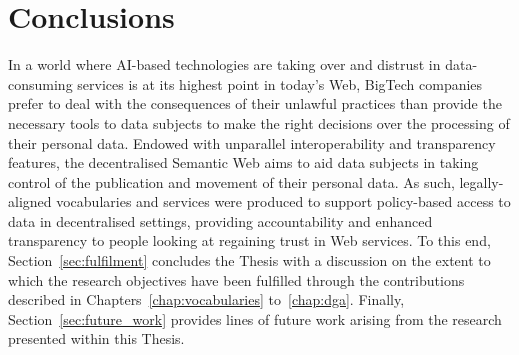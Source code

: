 \chapter{Conclusions}
\label{chap:conclusions}

In a world where AI-based technologies are taking over and distrust in data-consuming services is at its highest point in today's Web, BigTech companies prefer to deal with the consequences of their unlawful practices than provide the necessary tools to data subjects to make the right decisions over the processing of their personal data.
Endowed with unparallel interoperability and transparency features, the decentralised Semantic Web aims to aid data subjects in taking control of the publication and movement of their personal data.
As such, legally-aligned vocabularies and services were produced to support policy-based access to data in decentralised settings, providing accountability and enhanced transparency to people looking at regaining trust in Web services. 
To this end, Section~\ref{sec:fulfilment} concludes the Thesis with a discussion on the extent to which the research objectives have been fulfilled through the contributions described in Chapters~\ref{chap:vocabularies} to~\ref{chap:dga}.
Finally, Section~\ref{sec:future_work} provides lines of future work arising from the research presented within this Thesis.


